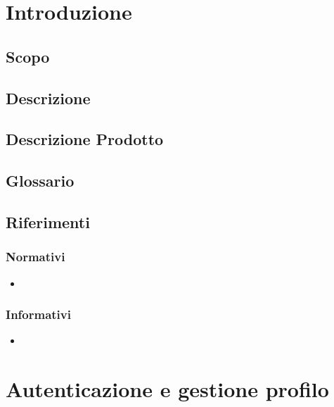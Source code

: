 \documentclass[12pt,a4paper]{article}
\begin{document}
	\newpage
	\tableofcontents
	\newpage
	\listoftables
	\listoffigures
	\newpage
	
	
	\section{Introduzione}	\label{intro}
	
	\subsection{Scopo}

	
	\subsection{Descrizione}

	
	\subsection{Descrizione Prodotto}
	\descrizioneProdotto
	
	\subsection{Glossario}
	\glossarioPrint
	
	\subsection{Riferimenti}
	
	\subsubsection{Normativi}
	\begin{itemize}
		\item
		
	\end{itemize}
	
	\subsubsection{Informativi}
	\begin{itemize}
		\item 
	\end{itemize}
	
	\newpage

	\section{Autenticazione e gestione profilo}
\end{document}
